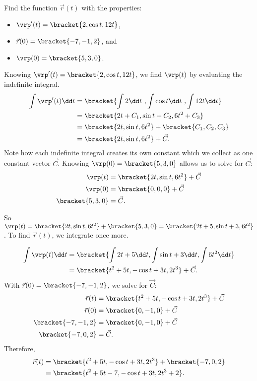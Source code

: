\begin{example}\label{ex_vvfint2}%
Find the function $\vec r(t)$ with the properties:
\begin{itemize}
	\item $\vrp'(t) =\bracket{2, \cos t, 12t}$,
	\item $\vec r(0) =\bracket{-7,-1,2}$, and
	\item	$\vrp(0) =\bracket{5,3,0}$.
\end{itemize}
\solution
Knowing $\vrp'(t) =\bracket{2,\cos t, 12t}$, we find $\vrp(t)$ by evaluating the indefinite integral.
\begin{align*}
\int \vrp'(t)\dd t &=\bracket{\int 2\dd t\ , \int \cos t\dd t\ , \int 12t\dd t}\\
						&=\bracket{2t+C_1, \sin t+ C_2, 6t^2 + C_3}\\
						&=\bracket{2t,\sin t,6t^2}+\bracket{C_1,C_2,C_3}\\
						&=\bracket{2t,\sin t,6t^2}+ \vec C.
\end{align*}
Note how each indefinite integral creates its own constant which we collect as one constant vector $\vec C$. Knowing $\vrp(0) =\bracket{5,3,0}$ allows us to solve for $\vec C$:
\begin{align*}
\vrp(t) & =\bracket{2t,\sin t,6t^2}+ \vec C\\
\vrp(0) &=\bracket{0,0,0}+ \vec C\\
\bracket{5,3,0}&= \vec C.
\end{align*}

So $\vrp(t) =\bracket{2t,\sin t,6t^2}+\bracket{5,3,0}=\bracket{2t+5, \sin t + 3, 6t^2}$. To find $\vec r(t)$, we integrate once more.

\begin{align*}
\int \vrp(t)\dd t &=\bracket{\int 2t+5\dd t, \int \sin t + 3\dd t, \int 6t^2\dd t}\\
							&=\bracket{t^2+5t, -\cos t + 3t, 2t^3}+ \vec C.
\end{align*}
With $\vec r(0) =\bracket{-7,-1,2}$, we solve for $\vec C$:
\begin{align*}
\vec r(t) &=\bracket{t^2+5t, -\cos t + 3t, 2t^3}+ \vec C\\
\vec r(0) &=\bracket{0,-1,0}+ \vec C\\
\bracket{-7,-1,2}&=\bracket{0,-1,0}+ \vec C\\
\bracket{-7,0,2}&= \vec C.
\end{align*}
Therefore,
\begin{align*}
 \vec r(t) &=\bracket{t^2+5t, -\cos t + 3t, 2t^3}+\bracket{-7,0,2}\\
 &=\bracket{t^2+5t-7,-\cos t+3t,2t^3+2}.
\end{align*}
\end{example}

